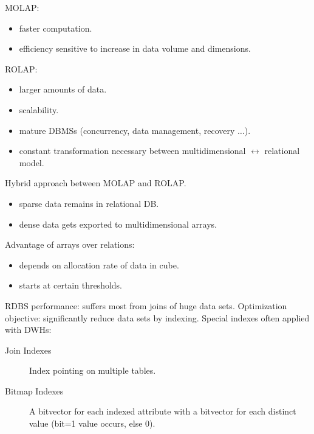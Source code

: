 \begin{breakbox}
\newline MOLAP:
\begin{itemize}
	\item faster computation.
	\item efficiency sensitive to increase in data volume and dimensions.
\end{itemize}
ROLAP:
\begin{itemize}
	\item larger amounts of data.
	\item scalability.
	\item mature DBMSs (concurrency, data management, recovery $\ldots$).
	\item constant transformation necessary between multidimensional $\leftrightarrow$ relational model.
\end{itemize}
\end{breakbox}

\begin{breakbox}
 Hybrid approach between MOLAP and ROLAP.
\begin{itemize}
	\item sparse data remains in relational DB.
	\item dense data gets exported to multidimensional arrays.
\end{itemize}
Advantage of arrays over relations:
\begin{itemize}
	\item depends on allocation rate of data in cube.
	\item starts at certain thresholds.
\end{itemize}
\end{breakbox}

\begin{breakbox}
\newline RDBS performance: suffers most from joins of huge data sets.
\newline Optimization objective: significantly reduce data sets by indexing.
\newline Special indexes often applied with DWHs:
\begin{description}
	\item[Join Indexes] Index pointing on multiple tables.
	\item[Bitmap Indexes] A bitvector for each indexed attribute with a 
	bitvector for each distinct value (bit=1 value occurs, else 0).
\end{description}
\end{breakbox}

